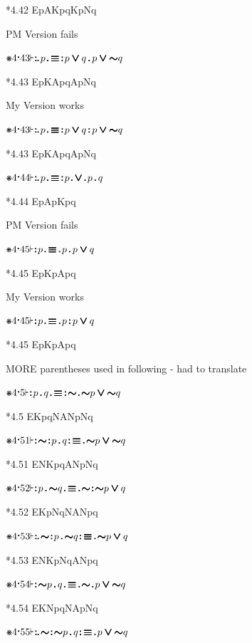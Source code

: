 \documentclass[12pt]{article}
\newcommand{\pmthm}{\mathpunct{\text{\scalebox{.5}[1]{$\boldsymbol\vdash$}}}} %
\newcommand{\pmast}{\text{\resizebox{!}{.75\height}{\ding{107}}}} %
\newcommand{\pmcdot}{\text{\raisebox{.05cm}{$\boldsymbol\cdot$}}} %
\newcommand{\pmd}{\hbox{\rule{.3ex}{.3ex}}} %
\newcommand{\pmdd}{\overset{\pmd}{\pmd}} %
\newcommand{\pmdot}{\mathinner{\pmd}}
\newcommand{\pmdott}{\mathinner{\pmdd}}
\newcommand{\pmdottt}{\mathinner{\pmdd\hspace{1pt}\pmd}}
\newcommand{\pmnot}{\mathord{\ooalign{$\boldsymbol{\sim}\mkern.5mu$\hidewidth\cr$\boldsymbol{\sim}$\cr\hidewidth$\mkern.5mu\boldsymbol{\sim}$}}}
\newcommand{\pmor}{\mathbin{\ooalign{$\boldsymbol{\vee}\mkern.5mu$\hidewidth\cr$\boldsymbol{\vee}$\cr\hidewidth$\mkern.5mu\boldsymbol{\vee}$}}}
\newcommand{\pmand}{\mathbin{\pmd}}%
\newcommand{\pmandd}{\mathbin{\pmdd}}
\newcommand{\pmiff}{\mathbin{\ooalign{$\boldsymbol{\equiv}\mkern.5mu$\hidewidth\cr$\boldsymbol{\equiv}$\cr\hidewidth$\mkern.5mu\boldsymbol{\equiv}$}}} %
\begin{document}
*4.42 EpAKpqKpNq










PM Version fails

$\pmast 4 \pmcdot 43 \pmthm \pmdottt p \pmdot \pmiff \pmdott p \pmor q \pmand p \pmor \pmnot q$

*4.43 EpKApqApNq


My Version works

$\pmast 4 \pmcdot 43 \pmthm \pmdottt p \pmdot \pmiff \pmdott p \pmor q \pmandd p \pmor \pmnot q$


*4.43 EpKApqApNq

$\pmast 4 \pmcdot 44 \pmthm \pmdottt p \pmdot \pmiff \pmdott p \pmdot \pmor \pmdot p \pmand q$

*4.44 EpApKpq

PM Version fails

$\pmast 4 \pmcdot 45 \pmthm \pmdott p \pmdot \pmiff \pmdot p \pmand p \pmor q$

*4.45 EpKpApq

My Version works

$\pmast 4 \pmcdot 45 \pmthm \pmdott p \pmdot \pmiff \pmdot p \pmandd p \pmor q$

*4.45 EpKpApq

MORE parentheses used in following - had to translate

$\pmast 4 \pmcdot 5 \pmthm \pmdott p \pmand q \pmdot \pmiff \pmdott \pmnot \pmdot \pmnot p \pmor \pmnot q    $

*4.5 EKpqNANpNq

$\pmast 4 \pmcdot 51 \pmthm \pmdott \pmnot \pmdott p \pmand q \pmdott \pmiff \pmdot \pmnot p \pmor \pmnot q   $

*4.51 ENKpqANpNq

$\pmast 4 \pmcdot 52 \pmthm \pmdott p \pmand \pmnot q \pmdot \pmiff \pmdot \pmnot \pmdott \pmnot p \pmor q   $

*4.52 EKpNqNANpq

$\pmast 4 \pmcdot 53 \pmthm \pmdottt \pmnot \pmdott p \pmand \pmnot q \pmdott \pmiff \pmdot \pmnot p \pmor q   $

*4.53 ENKpNqANpq

$\pmast 4 \pmcdot 54 \pmthm \pmdott \pmnot p \pmand q \pmdot \pmiff \pmdot \pmnot \pmdot p \pmor \pmnot q   $

*4.54 EKNpqNApNq

$\pmast 4 \pmcdot 55 \pmthm \pmdottt \pmnot \pmdott \pmnot p \pmand q \pmdott \pmiff \pmdot p \pmor \pmnot q   $
\end{document}
